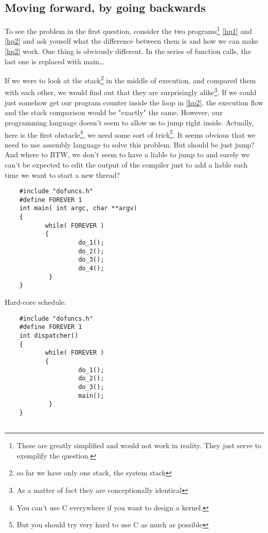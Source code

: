 {		
	\subsection{Moving forward, by going backwards}
		To see the problem in the first question, consider the two programs\footnote{These are greatly simplified and would not work in reality. They just serve to exemplify the question.} \ref{hp1} and \ref{hp2} and ask youself what the difference between them is and how we can make \ref{hp2} work. One thing is obviously different. In the series of function calls, the last one is replaced with main\ldots

		If we were to look at the stack\footnote{so far we have only one stack, the system stack} in the middle of execution, and compared them with each other, we would find out that they are surprisingly alike\footnote{As a matter of fact they are conceptionally identical}. If we could just somehow get our program counter inside the loop in \ref{hp2}, the execution flow and the stack comparison would be "exactly" the same. However, our programming language doesn't seem to allow us to jump right inside. Actually, here is the first obstacle\footnote{You can't use C everywhere if you want to design a kernel.}, we need some sort of trick\footnote{But you should try very hard to use C as much as possible}. It seems obvious that we need to use assembly language to solve this problem. But should be just jump? And where to BTW, we don't seem to have a liable to jump to and surely we can't be expected to edit the output of the compiler just to add a liable each time we want to start a new thread?

	\begin{table}[!hbp]
	\begin{verbatim}
	#include "dofuncs.h"
	#define FOREVER 1
	int main( int argc, char **argv)
	{ 
	       while( FOREVER )
	       {
	                do_1();
	                do_2();
	                do_3();
	                do_4();
	        }
	}
	\end{verbatim}
	\caption{Hard-core schedule.\label{hp1}}
	\end{table}

	\begin{table}[!hbp]
	\begin{verbatim}
	#include "dofuncs.h"
	#define FOREVER 1
	int dispatcher()
	{ 
	       while( FOREVER )
	       {
	                do_1();
	                do_2();
	                do_3();
	                main();
	        }
	}


\end{verbatim}
\end{table}}
